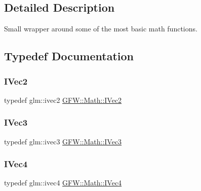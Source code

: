 \subsection{Detailed Description}
Small wrapper around some of the most basic math functions. 

\subsection{Typedef Documentation}
\mbox{\label{namespace_g_f_w_1_1_math_ab6d2f3e9b7437b6947f3bc18f723ffb4}} 
\subsubsection{\texorpdfstring{I\+Vec2}{IVec2}}
{\footnotesize\ttfamily typedef glm\+::ivec2 \hyperlink{namespace_g_f_w_1_1_math_ab6d2f3e9b7437b6947f3bc18f723ffb4}{G\+F\+W\+::\+Math\+::\+I\+Vec2}}

\mbox{\label{namespace_g_f_w_1_1_math_aaf8f1459d5e42f6e52f8af0dbf2888ab}} 
\subsubsection{\texorpdfstring{I\+Vec3}{IVec3}}
{\footnotesize\ttfamily typedef glm\+::ivec3 \hyperlink{namespace_g_f_w_1_1_math_aaf8f1459d5e42f6e52f8af0dbf2888ab}{G\+F\+W\+::\+Math\+::\+I\+Vec3}}

\mbox{\label{namespace_g_f_w_1_1_math_a710b3588a23f538485a8760e9e109b96}} 
\subsubsection{\texorpdfstring{I\+Vec4}{IVec4}}
{\footnotesize\ttfamily typedef glm\+::ivec4 \hyperlink{namespace_g_f_w_1_1_math_a710b3588a23f538485a8760e9e109b96}{G\+F\+W\+::\+Math\+::\+I\+Vec4}}

\mbox{\label{namespace_g_f_w_1_1_math_a84c8cb525c3c8be2c572eaf2839d76a2}} 
